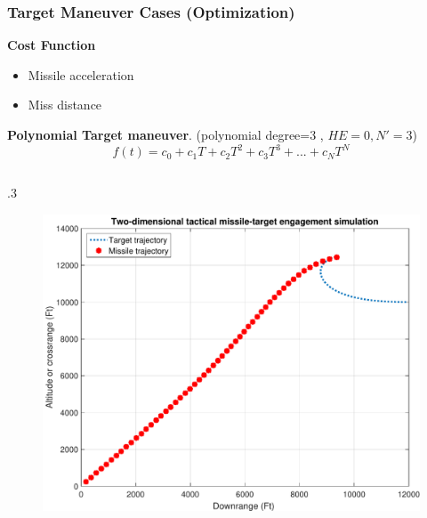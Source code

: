\documentclass{beamer}
\begin{document}
\begin{frame}
\frametitle{Target Maneuver Cases (Optimization)}
\textbf{Cost Function}
\begin{itemize}
	\item Missile acceleration
	\item Miss distance
\end{itemize}
\textbf{Polynomial Target maneuver}. (polynomial degree=3 , $HE=0 , N'=3$)
\begin{equation}
f(t) = c_0 + c_1 T + c_2 T^2 + c_3 T^3 + ... + c_N T^N
\end{equation} 

\begin{columns}[c]
	\begin{column} {.3\linewidth}
		\begin{figure}[H]
			\centering
			\includegraphics[scale = 0.18]{fig/trajectoryP3N3.pdf}
			\label{trajectoryP3}
		\end{figure}
	\end{column}


\end{columns}
\end{frame}
\end{document}
